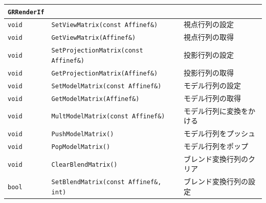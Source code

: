 \begin{center}
\begin{tabular}{p{.1\hsize}p{.5\hsize}p{.3\hsize}}
\texttt{GRRenderIf}	& & 										\\ \midrule
\texttt{void} & \texttt{SetViewMatrix(const Affinef\&)}			& \KLUDGE 視点行列の設定	\\
\texttt{void} & \texttt{GetViewMatrix(Affinef\&)}				& \KLUDGE 視点行列の取得	\\
\texttt{void} & \texttt{SetProjectionMatrix(const Affinef\&)}	& \KLUDGE 投影行列の設定	\\
\texttt{void} & \texttt{GetProjectionMatrix(Affinef\&)}			& \KLUDGE 投影行列の取得	\\
\texttt{void} & \texttt{SetModelMatrix(const Affinef\&)}		& \KLUDGE モデル行列の設定	\\
\texttt{void} & \texttt{GetModelMatrix(Affinef\&)}				& \KLUDGE モデル行列の取得	\\
\texttt{void} & \texttt{MultModelMatrix(const Affinef\&)}		& \KLUDGE モデル行列に変換をかける	\\
\texttt{void} & \texttt{PushModelMatrix()}						& \KLUDGE モデル行列をプッシュ	\\
\texttt{void} & \texttt{PopModelMatrix()}						& \KLUDGE モデル行列をポップ	\\
\texttt{void} & \texttt{ClearBlendMatrix()}						& \KLUDGE ブレンド変換行列のクリア	\\
\texttt{bool} & \texttt{SetBlendMatrix(const Affinef\&, int)}	& \KLUDGE ブレンド変換行列の設定	\\
\end{tabular}
\end{center}

